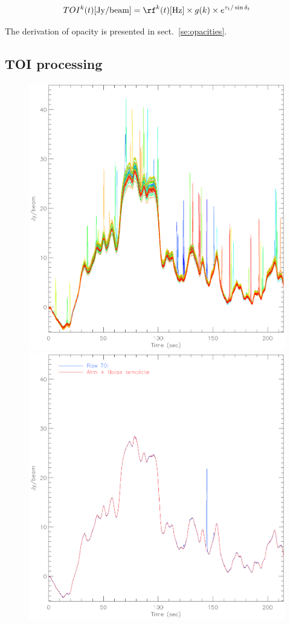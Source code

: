 \begin{equation}
TOI^k(t) [{\rm Jy/beam}] = \rf^k(t)[{\rm Hz}] \times g(k) \times e^{\tau_t/\sin\delta_t}
\end{equation}

The derivation of opacity is presented in sect.~\ref{se:opacities}.

\subsection{TOI processing}
\label{se:toi_proc}

\begin{figure}[ht!]
\begin{center}
\includegraphics[clip, angle=0, scale=0.4]{Figures/toi_plot.eps}
\includegraphics[clip, angle=0, scale=0.4]{Figures/toi_plot_decorr.eps}

\end{center}
\end{figure}
